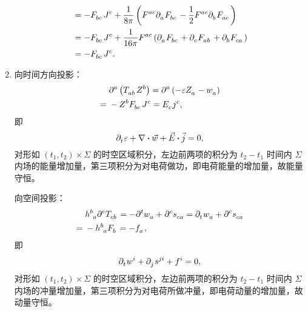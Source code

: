 \begin{xiti}
\begin{zm}
\begin{enumerate}[label=(\alph*)]
\begin{equation*}
\begin{split}
						&= - \tensor{F}{_b_c} \tensor{J}{^c} + \frac{1}{8\pi} \left( \tensor{F}{^a^c} \tensor{\partial}{_a} \tensor{F}{_b_c} - \frac{1}{2} \tensor{F}{^a^c} \tensor{\partial}{_b} \tensor{F}{_a_c} \right)\\
						&= - \tensor{F}{_b_c} \tensor{J}{^c} + \frac{1}{16\pi} \tensor{F}{^a^c} \left( \tensor{\partial}{_a} \tensor{F}{_b_c} + \tensor{\partial}{_c} \tensor{F}{_a_b} + \tensor{\partial}{_b} \tensor{F}{_c_a} \right)\\
						&= - \tensor{F}{_b_c} \tensor{J}{^c}.
					\end{split}
				\end{equation*}
				\item 向时间方向投影：
				\begin{equation*}
					\begin{split}
						&\tensor{\partial}{^a} \left( \tensor{T}{_a_b} \tensor{Z}{^b} \right) = \tensor{\partial}{^a} \left( -\varepsilon \tensor{Z}{_a} - \tensor{w}{_a} \right)\\
						={}& - \tensor{Z}{^b} \tensor{F}{_b_c} \tensor{J}{^c} = \tensor{E}{_c} \tensor{j}{^c},
					\end{split}
				\end{equation*}
				即
				\begin{equation*}
					\Partial{t} \varepsilon + \nabla \vdot \myvec{w} + \myvec{E} \vdot \myvec{j} = 0,
				\end{equation*}
				对形如 $(t_1,t_2) \times \Sigma$ 的时空区域积分，左边前两项的积分为 $t_2-t_1$ 时间内 $\Sigma$ 内场的能量增加量，第三项积分为对电荷做功，即电荷能量的增加量，故能量守恒。

				向空间投影：
				\begin{equation*}
					\begin{split}
						&\tensor{h}{^b_a} \tensor{\partial}{^c} \tensor{T}{_c_b} = -\tensor{\partial}{^t} \tensor{w}{_a} + \tensor{\partial}{^c} \tensor{s}{_c_a}=\tensor{\partial}{_t} \tensor{w}{_a} + \tensor{\partial}{^c} \tensor{s}{_c_a}\\
						={}& -\tensor{h}{^b_a} \tensor{F}{_b} = -\tensor{f}{_a},
					\end{split}
				\end{equation*}
				即
				\begin{equation*}
					\Partial{t} \tensor{w}{^i} + \Partial{j} \tensor{s}{^j^i} + \tensor{f}{^i} = 0,
				\end{equation*}
				对形如 $(t_1,t_2) \times \Sigma$ 的时空区域积分，左边前两项的积分为 $t_2-t_1$ 时间内 $\Sigma$ 内场的冲量增加量，第三项积分为对电荷所做冲量，即电荷动量的增加量，故动量守恒。
			\end{enumerate}
		\end{zm}


\end{xiti}
